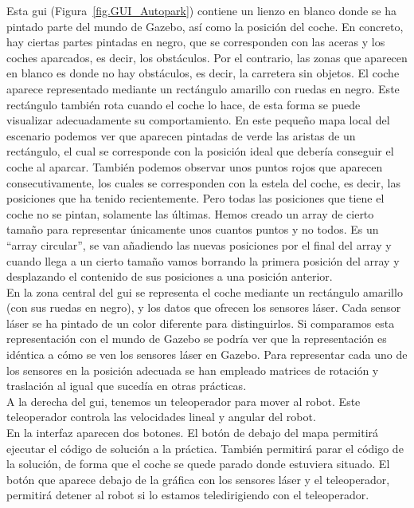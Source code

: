 Esta \acrshort{gui} (Figura~\ref{fig.GUI_Autopark}) contiene un lienzo en blanco donde se ha pintado parte del mundo de Gazebo, así como la posición del coche. En concreto, hay ciertas partes pintadas en negro, que se corresponden con las aceras y los coches aparcados, es decir, los obstáculos. Por el contrario, las zonas que aparecen en blanco es donde no hay obstáculos, es decir, la carretera sin objetos. El coche aparece representado mediante un rectángulo amarillo con ruedas en negro. Este rectángulo también rota cuando el coche lo hace, de esta forma se puede visualizar adecuadamente su comportamiento. En este pequeño mapa local del escenario podemos ver que aparecen pintadas de verde las aristas de un rectángulo, el cual se corresponde con la posición ideal que debería conseguir el coche al aparcar. También podemos observar unos puntos rojos que aparecen consecutivamente, los cuales se corresponden con la estela del coche, es decir, las posiciones que ha tenido recientemente. Pero todas las posiciones que tiene el coche no se pintan, solamente las últimas. Hemos creado un array de cierto tamaño para representar únicamente unos cuantos puntos y no todos. Es un ``array circular'', se van añadiendo las nuevas posiciones por el final del array y cuando llega a un cierto tamaño vamos borrando la primera posición del array y desplazando el contenido de sus posiciones a una posición anterior. \\

En la zona central del \acrshort{gui} se representa el coche mediante un rectángulo amarillo (con sus ruedas en negro), y los datos que ofrecen los sensores láser. Cada sensor láser se ha pintado de un color diferente para distinguirlos. Si comparamos esta representación con el mundo de Gazebo se podría ver que la representación es idéntica a cómo se ven los sensores láser en Gazebo. Para representar cada uno de los sensores en la posición adecuada se han empleado matrices de rotación y traslación al igual que sucedía en otras prácticas.\\

A la derecha del \acrshort{gui}, tenemos un teleoperador para mover al robot. Este teleoperador controla las velocidades lineal y angular del robot. \\

En la interfaz aparecen dos botones. El botón de debajo del mapa permitirá ejecutar el código de solución a la práctica. También permitirá parar el código de la solución, de forma que el coche se quede parado donde estuviera situado. El botón que aparece debajo de la gráfica con los sensores láser y el teleoperador, permitirá detener al robot si lo estamos teledirigiendo con el teleoperador. \\

